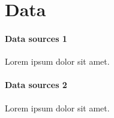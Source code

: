 \documentclass[main.tex]{subfiles}
\begin{document}
\section{Data}\label{s:data}

\paragraph{Data sources 1} Lorem ipsum dolor sit amet.

\paragraph{Data sources 2} Lorem ipsum dolor sit amet.
\end{document}
